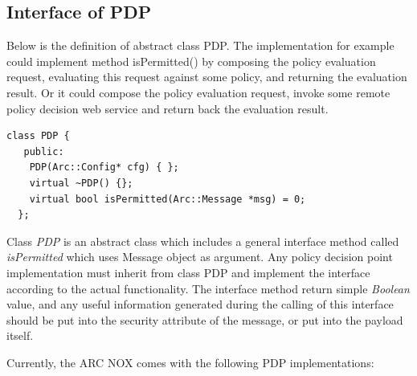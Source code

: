 \documentclass{article}                            %
\begin{document}
\subsection{Interface of PDP} %
\label{subsec:interface_pdp}

Below is the definition of abstract class PDP. The implementation for example could implement method isPermitted() by composing the policy evaluation request, evaluating this request against some policy, and returning the evaluation result. Or it could compose the policy evaluation request, invoke some remote policy decision web service and return back the evaluation result.

\begin{verbatim}
class PDP {
   public:
    PDP(Arc::Config* cfg) { };
    virtual ~PDP() {};
    virtual bool isPermitted(Arc::Message *msg) = 0;
  };
\end{verbatim}

Class \textit{PDP} is an abstract class which includes a general interface method called \textit{isPermitted} which uses Message object as argument. Any policy decision point implementation must inherit from class PDP and implement the interface according to the actual functionality. The interface method return simple \textit{Boolean} value, and any useful information generated during the calling of this interface should be put into the security attribute of the message, or put into the payload itself.

Currently, the ARC NOX comes with the following PDP implementations:
\end{document}
